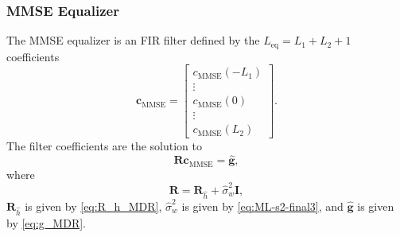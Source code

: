 \subsubsection{MMSE Equalizer}
The MMSE equalizer is an FIR filter defined by the $L_\text{eq}=L_1+L_2+1$ coefficients
\begin{equation}
\mathbf{c}_\text{MMSE} = 
\begin{bmatrix}
c_\text{MMSE}(-L_1) \\ \vdots \\ c_\text{MMSE}(0) \\ \vdots \\ c_\text{MMSE}(L_2)
\end{bmatrix}.
\end{equation}
The filter coefficients are the solution to \cite{paq-phase1-report:2014}
\begin{equation}
\mathbf{R} \mathbf{c}_\text{MMSE} = \hat{\mathbf{g}},
\label{eq:start_here_MMSE_MDR}
\end{equation}
where
\begin{equation}
\mathbf{R} = 
\mathbf{R}_{\hat{h}} + \hat{\sigma}^2_w \mathbf{I},
\end{equation}
$\mathbf{R}_{\hat{h}}$ is given by \eqref{eq:R_h_MDR}, $\hat{\sigma}^2_w$ is given by \eqref{eq:ML-s2-final3}, and $\hat{\mathbf{g}}$ is given by \eqref{eq:g_MDR}.

